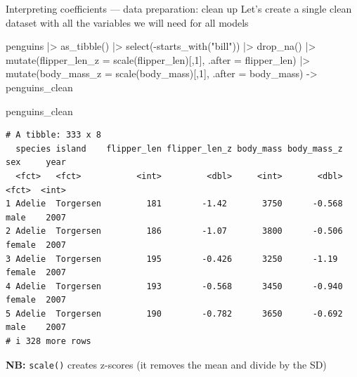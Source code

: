 \documentclass[
  10pt,
  ignorenonframetext,
  aspectratio=169,
  t]{beamer}
\newenvironment{Shaded}{\begin{snugshade}}{\end{snugshade}}
\newcommand{\AttributeTok}[1]{\textcolor[rgb]{0.40,0.45,0.13}{#1}}
\newcommand{\DecValTok}[1]{\textcolor[rgb]{0.68,0.00,0.00}{#1}}
\newcommand{\FunctionTok}[1]{\textcolor[rgb]{0.28,0.35,0.67}{#1}}
\newcommand{\NormalTok}[1]{\textcolor[rgb]{0.00,0.23,0.31}{#1}}
\newcommand{\OtherTok}[1]{\textcolor[rgb]{0.00,0.23,0.31}{#1}}
\newcommand{\SpecialCharTok}[1]{\textcolor[rgb]{0.37,0.37,0.37}{#1}}
\newcommand{\StringTok}[1]{\textcolor[rgb]{0.13,0.47,0.30}{#1}}
\let\oldtexttt\texttt
\renewcommand{\texttt}[1]{\colorbox{gray!20}{\oldtexttt{#1}}}
\begin{document}
\begin{frame}[fragile]{Interpreting coefficients --- data preparation:
clean up}
\protect{}\label{interpreting-coefficients-data-preparation-clean-up}
Let's create a single clean dataset with all the variables we will need
for all models

\footnotesize

\begin{Shaded}
\begin{Highlighting}[]
\NormalTok{penguins }\SpecialCharTok{|\textgreater{}} 
  \FunctionTok{as\_tibble}\NormalTok{() }\SpecialCharTok{|\textgreater{}} 
  \FunctionTok{select}\NormalTok{(}\SpecialCharTok{{-}}\FunctionTok{starts\_with}\NormalTok{(}\StringTok{"bill"}\NormalTok{)) }\SpecialCharTok{|\textgreater{}} 
  \FunctionTok{drop\_na}\NormalTok{() }\SpecialCharTok{|\textgreater{}} 
  \FunctionTok{mutate}\NormalTok{(}\AttributeTok{flipper\_len\_z =} \FunctionTok{scale}\NormalTok{(flipper\_len)[,}\DecValTok{1}\NormalTok{], }\AttributeTok{.after =}\NormalTok{ flipper\_len) }\SpecialCharTok{|\textgreater{}} 
  \FunctionTok{mutate}\NormalTok{(}\AttributeTok{body\_mass\_z =} \FunctionTok{scale}\NormalTok{(body\_mass)[,}\DecValTok{1}\NormalTok{], }\AttributeTok{.after =}\NormalTok{ body\_mass) }\OtherTok{{-}\textgreater{}}\NormalTok{ penguins\_clean}

\NormalTok{penguins\_clean}
\end{Highlighting}
\end{Shaded}

\begin{verbatim}
# A tibble: 333 x 8
  species island    flipper_len flipper_len_z body_mass body_mass_z sex     year
  <fct>   <fct>           <int>         <dbl>     <int>       <dbl> <fct>  <int>
1 Adelie  Torgersen         181        -1.42       3750      -0.568 male    2007
2 Adelie  Torgersen         186        -1.07       3800      -0.506 female  2007
3 Adelie  Torgersen         195        -0.426      3250      -1.19  female  2007
4 Adelie  Torgersen         193        -0.568      3450      -0.940 female  2007
5 Adelie  Torgersen         190        -0.782      3650      -0.692 male    2007
# i 328 more rows
\end{verbatim}

\normalsize

\textbf{NB:} \texttt{scale()} creates z-scores (it removes the mean and
divide by the SD)
\end{frame}
\end{document}
